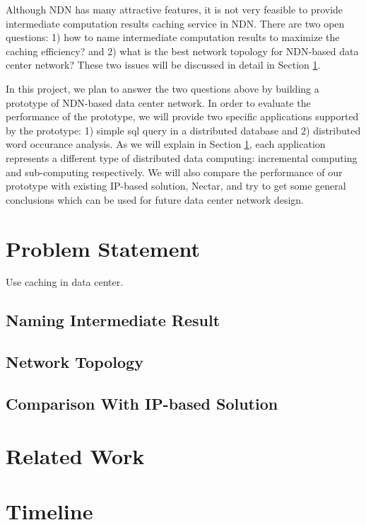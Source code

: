 \documentclass[journal]{IEEEtran}
\begin{document}
Although NDN has many attractive features, it is not very feasible to provide
intermediate computation results caching service in NDN.  There are two open
questions: 1) how to name intermediate computation results to maximize the
caching efficiency? and 2) what is the best network topology for NDN-based data
center network?  These two issues will be discussed in detail in Section
\ref{sec:problem_statement}.

In this project, we plan to answer the two questions above by building a
prototype of NDN-based data center network.  In order to evaluate the
performance of the prototype, we will provide two specific applications
supported by the prototype: 1) simple sql query in a distributed database and 2)
distributed word occurance analysis.  As we will explain in Section
\ref{sec:problem_statement}, each application represents a different type of
distributed data computing: incremental computing and sub-computing respectively.
We will also compare the performance of our prototype with existing IP-based
solution, Nectar, and try to get some general conclusions which can be used for
future data center network design.

\section{Problem Statement}\label{sec:problem_statement}
Use caching in data center.
\subsection{Naming Intermediate Result}
\subsection{Network Topology}
\subsection{Comparison With IP-based Solution}
\section{Related Work}
\section{Timeline}




\end{document}
